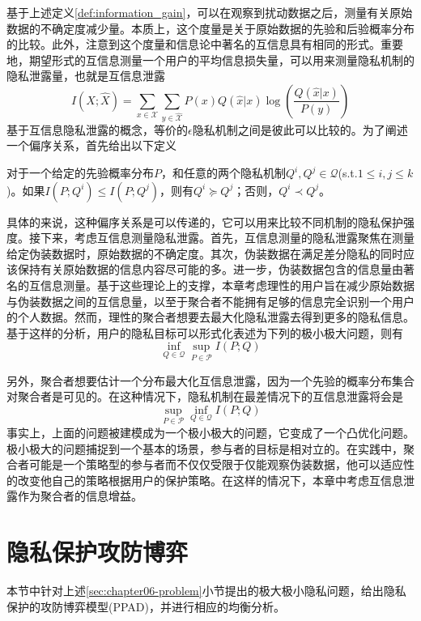 基于上述定义\ref{def:information_gain}，可以在观察到扰动数据之后，测量有关原始数据的不确定度减少量。本质上，这个度量是关于原始数据的先验和后验概率分布的比较。此外，注意到这个度量和信息论中著名的互信息具有相同的形式。重要地，期望形式的互信息测量一个用户的平均信息损失量，可以用来测量隐私机制的隐私泄露量，也就是互信息泄露
\begin{equation}
	I(X;\hat{X})=\sum_{x\in\mathcal{X}}\sum_{y\in\hat{\mathcal{X}}}P(x)Q(\hat{x}|x)\log\left(\frac{Q(\hat{x}|x)}{P(y)}\right)
\end{equation}
基于互信息隐私泄露的概念，等价的$\epsilon$隐私机制之间是彼此可以比较的。为了阐述一个偏序关系，首先给出以下定义
\begin{definition}
	对于一个给定的先验概率分布$P$，和任意的两个隐私机制$Q^i,Q^j\in \mathcal{Q}$(s.t.$1\leq i,j\leq k$)。如果$I(P;Q^i)\leq I(P;Q^j)$，则有$Q^i\succcurlyeq Q^j$；否则，$Q^i \prec Q^j$。
\end{definition}

具体的来说，这种偏序关系是可以传递的，它可以用来比较不同机制的隐私保护强度。接下来，考虑互信息测量隐私泄露。首先，互信息测量的隐私泄露聚焦在测量给定伪装数据时，原始数据的不确定度。其次，伪装数据在满足差分隐私的同时应该保持有关原始数据的信息内容尽可能的多。进一步，伪装数据包含的信息量由著名的互信息测量。基于这些理论上的支撑，本章考虑理性的用户旨在减少原始数据与伪装数据之间的互信息量，以至于聚合者不能拥有足够的信息完全识别一个用户的个人数据。然而，理性的聚合者想要去最大化隐私泄露去得到更多的隐私信息。基于这样的分析，用户的隐私目标可以形式化表述为下列的极小极大问题，则有
\begin{equation}
	\inf_{Q\in \mathcal{Q}}\sup_{P\in \mathcal{P}}I(P;Q)
\end{equation}

另外，聚合者想要估计一个分布最大化互信息泄露，因为一个先验的概率分布集合对聚合者是可见的。在这种情况下，隐私机制在最差情况下的互信息泄露将会是
\begin{equation}
	\sup_{P\in \mathcal{P}}\inf_{Q\in \mathcal{Q}}I(P;Q)
\end{equation}
事实上，上面的问题被建模成为一个极小极大的问题，它变成了一个凸优化问题\cite{boyd2004convex}。极小极大的问题捕捉到一个基本的场景，参与者的目标是相对立的。在实践中，聚合者可能是一个策略型的参与者而不仅仅受限于仅能观察伪装数据，他可以适应性的改变他自己的策略根据用户的保护策略。在这样的情况下，本章中考虑互信息泄露作为聚合者的信息增益。

\section{隐私保护攻防博弈}\label{sec:chapter06-PPAD}
本节中针对上述\ref{sec:chapter06-problem}小节提出的极大极小隐私问题，给出隐私保护的攻防博弈模型(PPAD)，并进行相应的均衡分析。
